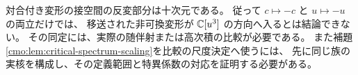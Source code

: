\begin{remark}[対合対称性だけでは中心方向を指定しない]
\label{cmo:rem:central-parity-insufficient}
対合付き変形の接空間の反変部分は十次元である。
従って $c\mapsto-c$ と $u\mapsto-u$ の両立だけでは、
移送された非可換変形が $\mathbb C[u^3]$ の方向へ入るとは結論できない。
その同定には、実際の随伴射または高次積の比較が必要である。
また補題\ref{cmo:lem:critical-spectrum-scaling}を比較の尺度決定へ使うには、
先に同じ族の実核を構成し、その定義範囲と特異係数の対応を証明する必要がある。
\end{remark}

